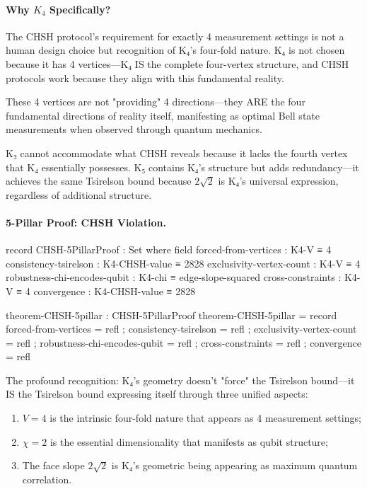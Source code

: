 \documentclass[11pt,a4paper]{book}
\begin{document}
\paragraph{Why $K_4$ Specifically?}
The CHSH protocol's requirement for exactly 4 measurement settings is not a human design choice but recognition of K₄'s four-fold nature. K₄ is not chosen because it has 4 vertices—K₄ IS the complete four-vertex structure, and CHSH protocols work because they align with this fundamental reality.

These 4 vertices are not "providing" 4 directions—they ARE the four fundamental directions of reality itself, manifesting as optimal Bell state measurements when observed through quantum mechanics.

K₃ cannot accommodate what CHSH reveals because it lacks the fourth vertex that K₄ essentially possesses. K₅ contains K₄'s structure but adds redundancy—it achieves the same Tsirelson bound because $2\sqrt{2}$ is K₄'s universal expression, regardless of additional structure.

\paragraph{5-Pillar Proof: CHSH Violation.}

\begin{code}
record CHSH-5PillarProof : Set where
  field
    forced-from-vertices : K4-V ≡ 4
    consistency-tsirelson : K4-CHSH-value ≡ 2828
    exclusivity-vertex-count : K4-V ≡ 4
    robustness-chi-encodes-qubit : K4-chi ≡ edge-slope-squared
    cross-constraints : K4-V ≡ 4
    convergence : K4-CHSH-value ≡ 2828

theorem-CHSH-5pillar : CHSH-5PillarProof
theorem-CHSH-5pillar = record
  { forced-from-vertices = refl
  ; consistency-tsirelson = refl
  ; exclusivity-vertex-count = refl
  ; robustness-chi-encodes-qubit = refl
  ; cross-constraints = refl
  ; convergence = refl
  }
\end{code}

The profound recognition: K₄'s geometry doesn't "force" the Tsirelson bound—it IS the Tsirelson bound expressing itself through three unified aspects:
\begin{enumerate}
\item $V = 4$ is the intrinsic four-fold nature that appears as 4 measurement settings;
\item $\chi = 2$ is the essential dimensionality that manifests as qubit structure;
\item The face slope $2\sqrt{2}$ is K₄'s geometric being appearing as maximum quantum correlation.
\end{enumerate}
\end{document}
